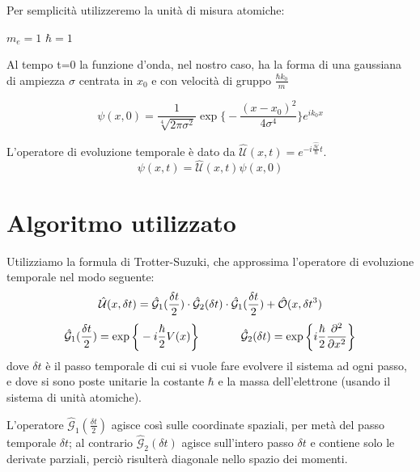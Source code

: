 \documentclass[12pt,onecolumn,a4paper]{memoir}
\begin{document}
Per semplicità utilizzeremo la unità di misura atomiche:


$m_e=1$ $\hbar=1$\newline
 
Al tempo t=0 la funzione d'onda, nel nostro caso, ha la forma di una gaussiana di ampiezza $\sigma$ centrata in $x_0$ e con velocità di gruppo $\frac{\hbar k_0}{m}$

 \begin{equation}
\psi (x,0) = \dfrac{1}{\sqrt[4]{2\pi\sigma^2}} \exp \bigg\lbrace -\dfrac{(x-x_0)^2}{4\sigma^4}\bigg\rbrace e^{ik_0x}
\end{equation}

L'operatore di evoluzione temporale è dato da $\hat{\mathcal{U}}(x,t) = e^{-i\frac{\hat{\mathcal{H}}}{\hbar}t}$.
\begin{equation}
\psi(x,t) = \hat{\mathcal{U}}(x,t)\psi(x,0)
\end{equation}\newline
 
\section*{Algoritmo utilizzato}



Utilizziamo la formula di Trotter-Suzuki, che approssima l'operatore di evoluzione temporale nel modo seguente:
\begin{equation}
\small\hat{\mathcal{U}}(x, \delta t) = \hat{\mathcal{G}}_1(\frac{\delta t}{2})\cdot\hat{\mathcal{G}}_2(\delta t)\cdot\hat{\mathcal{G}}_1(\frac{\delta t}{2})+\hat{\mathcal{O}}(x,{\delta t}^3)
\end{equation}
\begin{equation}
\small\hat{\mathcal{G}}_1(\frac{\delta t}{2}) = \exp\bigg\lbrace-i\frac{\hbar}{2}V(x)\bigg\rbrace \qquad \qquad \hat{\mathcal{G}}_2(\delta t) = \exp\bigg\lbrace i\frac{\hbar}{2}\frac{\partial^2}{\partial x^2}\bigg\rbrace
\end{equation}
dove $\delta t$ è il passo temporale di cui si vuole fare evolvere il sistema ad ogni passo, e dove si sono poste unitarie la costante $\hbar$ e la massa dell'elettrone (usando il sistema di unità atomiche).\newline

L'operatore $\hat{\mathcal{G}}_1(\frac{\delta t}{2})$ agisce così sulle coordinate spaziali, per metà del passo temporale $\delta t$; al contrario $\hat{\mathcal{G}}_2(\delta t)$ agisce sull'intero passo $\delta t$ e contiene solo le derivate parziali, perciò risulterà diagonale nello spazio dei momenti.\newline
\end{document}

